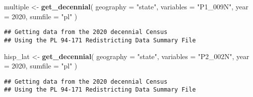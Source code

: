 \documentclass[
]{article}
\newenvironment{Shaded}{\begin{snugshade}}{\end{snugshade}}
\newcommand{\AttributeTok}[1]{\textcolor[rgb]{0.13,0.29,0.53}{#1}}
\newcommand{\DecValTok}[1]{\textcolor[rgb]{0.00,0.00,0.81}{#1}}
\newcommand{\FunctionTok}[1]{\textcolor[rgb]{0.13,0.29,0.53}{\textbf{#1}}}
\newcommand{\NormalTok}[1]{#1}
\newcommand{\OtherTok}[1]{\textcolor[rgb]{0.56,0.35,0.01}{#1}}
\newcommand{\StringTok}[1]{\textcolor[rgb]{0.31,0.60,0.02}{#1}}
\begin{document}
\begin{Shaded}
\begin{Highlighting}[]
\NormalTok{multiple }\OtherTok{\textless{}{-}} \FunctionTok{get\_decennial}\NormalTok{(}
  \AttributeTok{geography =} \StringTok{"state"}\NormalTok{,}
  \AttributeTok{variables =} \StringTok{"P1\_009N"}\NormalTok{,}
  \AttributeTok{year =} \DecValTok{2020}\NormalTok{,}
  \AttributeTok{sumfile =} \StringTok{"pl"}
\NormalTok{)}
\end{Highlighting}
\end{Shaded}

\begin{verbatim}
## Getting data from the 2020 decennial Census
## Using the PL 94-171 Redistricting Data Summary File
\end{verbatim}

\begin{Shaded}
\begin{Highlighting}[]
\NormalTok{hisp\_lat }\OtherTok{\textless{}{-}} \FunctionTok{get\_decennial}\NormalTok{(}
  \AttributeTok{geography =} \StringTok{"state"}\NormalTok{,}
  \AttributeTok{variables =} \StringTok{"P2\_002N"}\NormalTok{,}
  \AttributeTok{year =} \DecValTok{2020}\NormalTok{,}
  \AttributeTok{sumfile =} \StringTok{"pl"}
\NormalTok{)}
\end{Highlighting}
\end{Shaded}

\begin{verbatim}
## Getting data from the 2020 decennial Census
## Using the PL 94-171 Redistricting Data Summary File
\end{verbatim}
\end{document}
